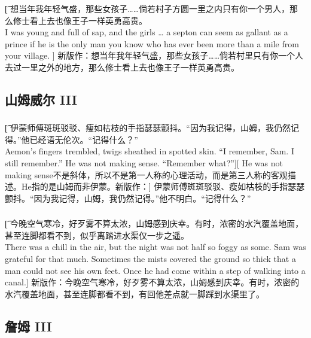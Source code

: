 \documentclass[12pt,a4paper]{article}
\begin{document}
\subsubsection{}\t[
	想当年我年轻气盛，那些女孩子……倘若村子方圆一里之内只有你一个男人，那么修士看上去也像王子一样英勇高贵。\\
	I was young and full of sap, and the girls … a septon can seem as gallant as a prince if he is the only man you know who has ever been more than a mile from your village. ]
	新版作：想当年我年轻气盛，那些女孩子……倘若村里只有你一个人去过一里之外的地方，那么修士看上去也像王子一样英勇高贵。
	
\subsection{山姆威尔 III}
\subsubsection{}\t[
	伊蒙师傅斑斑驳驳、瘦如枯枝的手指瑟瑟颤抖。“因为我记得，山姆，我仍然记得。”他已经语无伦次。“记得什么？”\\
	Aemon's fingers trembled, twigs sheathed in spotted skin. “I remember, Sam. I still remember.” He was not making sense. “Remember what?”][
	He was not making sense不是斜体，所以不是第一人称的心理活动，而是第三人称的客观描述。He指的是山姆而非伊蒙。新版作：]
	伊蒙师傅斑斑驳驳、瘦如枯枝的手指瑟瑟颤抖。“因为我记得，山姆，我仍然记得。”他不明白。“记得什么？”
	
\subsubsection{}\t[
	今晚空气寒冷，好歹雾不算太浓，山姆感到庆幸。有时，浓密的水汽覆盖地面，甚至连脚都看不到，似乎离踏进水渠仅一步之遥。\\
	There was a chill in the air, but the night was not half so foggy as some. Sam was grateful for that much. Sometimes the mists covered the ground so thick that a man could not see his own feet. Once he had come within a step of walking into a canal.] 
	新版作：今晚空气寒冷，好歹雾不算太浓，山姆感到庆幸。有时，浓密的水汽覆盖地面，甚至连脚都看不到，有回他差点就一脚踩到水渠里了。
	
\subsection{詹姆 III}
\end{document}
